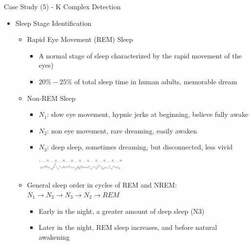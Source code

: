 \documentclass[
 size=14pt,
 paper=smartboard,  %
 mode=present, 		%
 display=slides, 	%
 style=tuliplab,  	%
 pauseslide,
 fleqn,leqno]{powerdot}{}
\begin{document}
\begin{slide}[toc=,bm=]{Case Study (5) - K Complex Detection}
\begin{itemize}
\item Sleep Stage Identification
\begin{itemize}
\item<2->
\small{Rapid Eye Movement (REM) Sleep}
\begin{itemize}
\item<2->
\small{A normal stage of sleep characterized by the rapid movement of the eyes)}
\item<2->
\small{$20\%-25\%$ of total sleep time in human adults, memorable dream}
\end{itemize}
\item<3->
{Non-REM Sleep}
\begin{itemize}
\item<3->
\small{\textbf{$N_1$}: slow eye movement, hypnic jerks at beginning, believe fully awake}
\item<3->
\small{\textbf{$N_2$}: non eye movement, rare dreaming, easily awaken}
\item<3->
\small{\textbf{$N_3$}: deep sleep, sometimes dreaming, but disconnected, less vivid}

\begin{flushleft}
  \includegraphics[width=0.4\textwidth]{figures//theme1//kcd.eps}
\end{flushleft}
\end{itemize}

\item<4->
General sleep order in cycles of REM and NREM:
$N_1 \rightarrow N_2 \rightarrow N_3 \rightarrow N_2 \rightarrow REM$
\begin{itemize}
\item<4->
\small{Early in the night, a greater amount of deep sleep (N3)}
\item<4->
\small{Later in the night, REM sleep increases, and before natural awakening}
\end{itemize}
\end{itemize}
\end{itemize}


\footnotesize{}
\end{slide}
\end{document}
